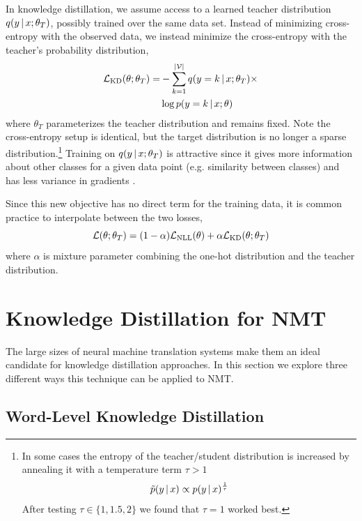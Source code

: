 \documentclass[11pt,letterpaper]{article}
\begin{document}
In knowledge distillation, we assume access to a learned teacher distribution $q(y\,|\, x; \theta_T)$,
possibly trained over the same data set. Instead of minimizing cross-entropy with the 
observed data, we instead minimize the cross-entropy with the teacher's probability distribution,
\begin{align*}
\mathcal{L}_{\text{KD}}(\theta;\theta_T) =& - \sum_{k=1}^{|\mathcal{V}|}  q(y = k \,|\, x;\theta_T) \times \\
& \log p(y = k \,|\, x;\theta)
\end{align*}
where $\theta_T$ parameterizes the teacher distribution and remains fixed.
Note the cross-entropy setup is identical, but the target distribution is no longer a sparse distribution.\footnote{
In some cases the entropy of the teacher/student 
distribution is increased by annealing it with
a temperature term $\tau > 1$
\begin{equation*}
\tilde{p}(y \,|\,  x) \propto p(y \,|\, x)^{\frac{1}{\tau}}
\end{equation*} After testing $\tau \in \{1, 1.5, 2\}$ we
found that  $\tau =1$ worked best.} Training on $q(y \,|\, x;\theta_T)$ is attractive
since it gives more information about other classes for a given data point (e.g.
similarity between classes) and has less variance in gradients \cite{Hinton2015}.

Since this new objective has no direct term for the training data,
it is common practice to interpolate between the two losses,
\begin{equation*}
\mathcal{L}(\theta;\theta_T) = (1-\alpha) \mathcal{L}_{\text{NLL}}(\theta) + \alpha \mathcal{L}_{\text{KD}}(\theta;\theta_T)
\end{equation*}
where $\alpha$ is mixture parameter combining the one-hot distribution and
the teacher distribution. 


\section{Knowledge Distillation for NMT} \label{seq-KD}

The large sizes of neural machine translation systems make them  an ideal candidate for 
knowledge distillation approaches. In this section we explore three different 
ways this technique can be applied to NMT.

\subsection{Word-Level Knowledge Distillation}
\end{document}
